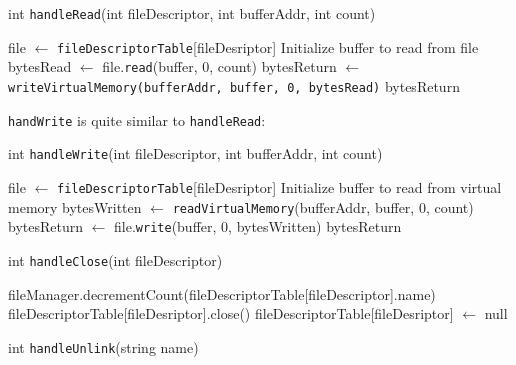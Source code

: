 \documentclass{article}
\begin{document}
\begin{spacing}{1.1}
\begin{algorithm}[htbp]
  \caption{int \texttt{handleRead}(int fileDescriptor, int bufferAddr, int count)}
\begin{algorithmic}[1]
  \ENDIF
  \STATE file $\leftarrow$ \texttt{fileDescriptorTable}[fileDesriptor]
  \ENDIF
  \STATE Initialize buffer to read from file
  \STATE bytesRead $\leftarrow$ file.\texttt{read}(buffer, 0, count)
  \ELSE
    \STATE bytesReturn $\leftarrow$ \texttt{writeVirtualMemory(bufferAddr, buffer, 0, bytesRead)}
    \RETURN bytesReturn
  \ENDIF
\end{algorithmic}
\end{algorithm}

\texttt{handWrite} is quite similar to \texttt{handleRead}:

\begin{algorithm}[htbp]
  \caption{int \texttt{handleWrite}(int fileDescriptor, int bufferAddr, int count)}
\begin{algorithmic}[1]
  \ENDIF
  \STATE file $\leftarrow$ \texttt{fileDescriptorTable}[fileDesriptor]
  \ENDIF
  \STATE Initialize buffer to read from virtual memory
  \STATE bytesWritten $\leftarrow$ \texttt{readVirtualMemory}(bufferAddr, buffer, 0, count)
  \ENDIF
  \STATE bytesReturn $\leftarrow$ file.\texttt{write}(buffer, 0, bytesWritten)
  \ENDIF
  \RETURN bytesReturn
\end{algorithmic}
\end{algorithm}

\begin{algorithm}[htbp]
  \caption{int \texttt{handleClose}(int fileDescriptor)}
\begin{algorithmic}[1]
  \ENDIF
  \STATE fileManager.decrementCount(fileDescriptorTable[fileDescriptor].name)
  \STATE fileDescriptorTable[fileDesriptor].close()
  \STATE fileDescriptorTable[fileDesriptor] $\leftarrow$ null
\end{algorithmic}
\end{algorithm}

\begin{algorithm}[htbp]
  \caption{int \texttt{handleUnlink}(string name)}
\begin{algorithmic}[1]
  \ENDIF
\end{algorithmic}
\end{algorithm}




\end{spacing}
\end{document}
